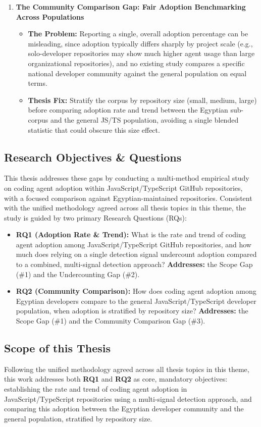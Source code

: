 \documentclass[11pt,a4paper]{article}
\begin{document}
\begin{enumerate}[leftmargin=1.5em, itemsep=6pt]
    \item \textbf{The Community Comparison Gap: Fair Adoption Benchmarking Across Populations}
    \begin{itemize}
        \item \textbf{The Problem:} Reporting a single, overall adoption percentage can be misleading, since adoption typically differs sharply by project scale (e.g., solo-developer repositories may show much higher agent usage than large organizational repositories), and no existing study compares a specific national developer community against the general population on equal terms.
        \item \textbf{Thesis Fix:} Stratify the corpus by repository size (small, medium, large) before comparing adoption rate and trend between the Egyptian sub-corpus and the general JS/TS population, avoiding a single blended statistic that could obscure this size effect.
    \end{itemize}
\end{enumerate}

\subsection{Research Objectives \& Questions}
This thesis addresses these gaps by conducting a multi-method empirical study on coding agent adoption within JavaScript/TypeScript GitHub repositories, with a focused comparison against Egyptian-maintained repositories. Consistent with the unified methodology agreed across all thesis topics in this theme, the study is guided by two primary Research Questions (RQs):

\begin{itemize}
    \item \textbf{RQ1 (Adoption Rate \& Trend):} What is the rate and trend of coding agent adoption among JavaScript/TypeScript GitHub repositories, and how much does relying on a single detection signal undercount adoption compared to a combined, multi-signal detection approach? \textbf{Addresses:} the Scope Gap (\#1) and the Undercounting Gap (\#2).
    \item \textbf{RQ2 (Community Comparison):} How does coding agent adoption among Egyptian developers compare to the general JavaScript/TypeScript developer population, when adoption is stratified by repository size? \textbf{Addresses:} the Scope Gap (\#1) and the Community Comparison Gap (\#3).
\end{itemize}
\subsection{Scope of this Thesis}
Following the unified methodology agreed across all thesis topics in this theme, this work addresses both \textbf{RQ1} and \textbf{RQ2} as core, mandatory objectives: establishing the rate and trend of coding agent adoption in JavaScript/TypeScript repositories using a multi-signal detection approach, and comparing this adoption between the Egyptian developer community and the general population, stratified by repository size.
\newpage
\end{document}
